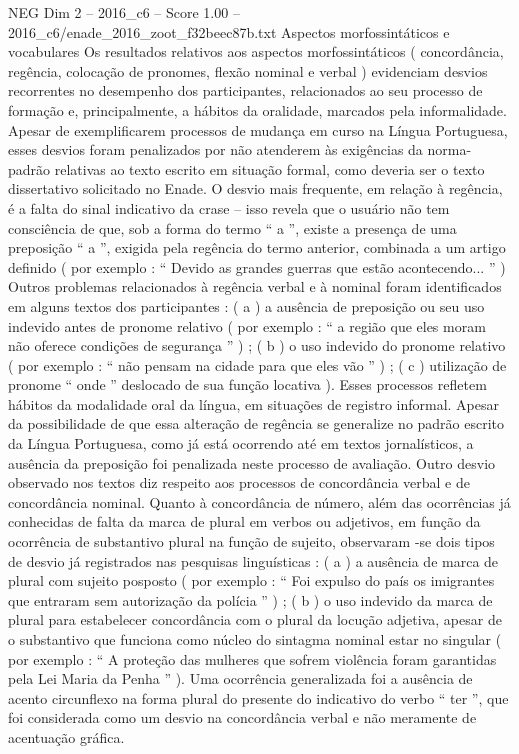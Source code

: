 \begin{textsample}{NEG Dim 2 – 2016\_c6 – Score 1.00 – 2016\_c6/enade\_2016\_zoot\_f32beec87b.txt}
Aspectos morfossintáticos e vocabulares Os resultados relativos aos aspectos morfossintáticos ( concordância, regência, colocação de pronomes, flexão nominal e verbal ) evidenciam desvios recorrentes no desempenho dos participantes, relacionados ao seu processo de formação e, principalmente, a hábitos da oralidade, marcados pela informalidade.
Apesar de exemplificarem processos de mudança em curso na Língua Portuguesa, esses desvios foram penalizados por não atenderem às exigências da norma-padrão relativas ao texto escrito em situação formal, como deveria ser o texto dissertativo solicitado no Enade.
O desvio mais frequente, em relação à regência, é a falta do sinal indicativo da crase – isso revela que o usuário não tem consciência de que, sob a forma do termo “ a ”, existe a presença de uma preposição “ a ”, exigida pela regência do termo anterior, combinada a um artigo definido ( por exemplo : “ Devido as grandes guerras que estão acontecendo... ” ) Outros problemas relacionados à regência verbal e à nominal foram identificados em alguns textos dos participantes : ( a ) a ausência de preposição ou seu uso indevido antes de pronome relativo ( por exemplo : “ a região que eles moram não oferece condições de segurança ” ) ; ( b ) o uso indevido do pronome relativo ( por exemplo : “ não pensam na cidade para que eles vão ” ) ; ( c ) utilização de pronome “ onde ” deslocado de sua função locativa ).
Esses processos refletem hábitos da modalidade oral da língua, em situações de registro informal.
Apesar da possibilidade de que essa alteração de regência se generalize no padrão escrito da Língua Portuguesa, como já está ocorrendo até em textos jornalísticos, a ausência da preposição foi penalizada neste processo de avaliação.
Outro desvio observado nos textos diz respeito aos processos de concordância verbal e de concordância nominal.
Quanto à concordância de número, além das ocorrências já conhecidas de falta da marca de plural em verbos ou adjetivos, em função da ocorrência de substantivo plural na função de sujeito, observaram -se dois tipos de desvio já registrados nas pesquisas linguísticas : ( a ) a ausência de marca de plural com sujeito posposto ( por exemplo : “ Foi expulso do país os imigrantes que entraram sem autorização da polícia ” ) ; ( b ) o uso indevido da marca de plural para estabelecer concordância com o plural da locução adjetiva, apesar de o substantivo que funciona como núcleo do sintagma nominal estar no singular ( por exemplo : “ A proteção das mulheres que sofrem violência foram garantidas pela Lei Maria da Penha ” ).
Uma ocorrência generalizada foi a ausência de acento circunflexo na forma plural do presente do indicativo do verbo “ ter ”, que foi considerada como um desvio na concordância verbal e não meramente de acentuação gráfica.

\end{textsample}
